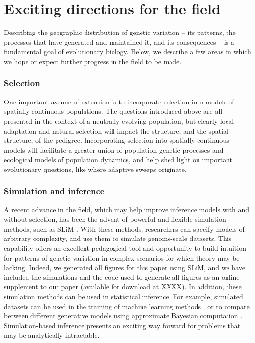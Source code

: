 \documentclass{ar-1col}
\begin{document}
\section{Exciting directions for the field}

Describing the geographic distribution of genetic variation -- 
its patterns, 
the processes that have generated and maintained it, 
and its consequences -- 
is a fundamental goal of evolutionary biology.
Below, we describe a few areas 
in which we hope or expect further progress in the field to be made.

\subsubsection{Selection}
One important avenue of extension is to incorporate selection into 
models of spatially continuous populations. 
The questions introduced above are all presented in the context 
of a neutrally evolving population,
but clearly local adaptation and natural selection will impact 
the structure, and the spatial structure, of the pedigree.
Incorporating selection into spatially continuous models 
will facilitate a greater union of population genetic processes 
and ecological models of population dynamics, 
and help shed light on important evolutionary questions, 
like where adaptive sweeps originate. 

\subsubsection{Simulation and inference} 
A recent advance in the field, 
which may help improve inference models with and without selection, 
has been the advent of powerful and flexible simulation methods, 
such as SLiM \citep{haller2018forward,haller2018treesequence,kelleher2018efficient}.
With these methods, 
researchers can specify models of arbitrary complexity, 
and use them to simulate genome-scale datasets.
This capability offers an excellent pedagogical tool 
and opportunity to build intuition for patterns of genetic variation 
in complex scenarios for which theory may be lacking.
Indeed, we generated all figures for this paper using SLiM, 
and we have included the simulations 
and the code used to generate all figures 
as an online supplement to our paper 
(available for download at XXXX).
In addition, these simulation methods can be used in statistical inference.
For example, simulated datasets can be used in the training 
of machine learning methods \citep[e.g.,][]{SchriderKern2018}, 
or to compare between different generative models using 
approximate Bayesian computation \citep{MarjoramTavare2006modern}.
Simulation-based inference presents an exciting way forward 
for problems that may be analytically intractable.
\end{document}
